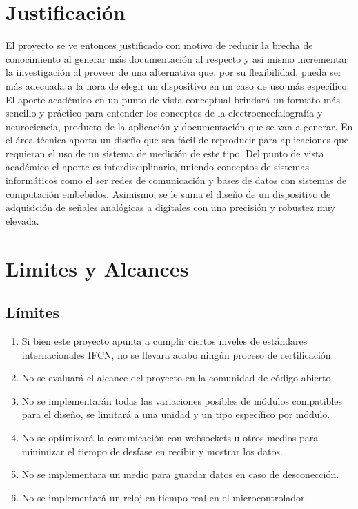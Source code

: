 \section{Justificación}
\label{sec:org0a2ade5}
El proyecto se ve entonces justificado con motivo de reducir la brecha de conocimiento al generar más documentación al respecto y así mismo incrementar la investigación al proveer de una alternativa que, por su flexibilidad, pueda ser más adecuada a la hora de elegir un dispositivo en un caso de uso más específico. El aporte académico en un punto de vista conceptual brindará un formato más sencillo y práctico para entender los conceptos de la electroencefalografía y neurociencia, producto de la aplicación y documentación que se van a generar. En el área técnica aporta un diseño que sea fácil de reproducir para aplicaciones que requieran el uso de un sistema de medición de este tipo.
Del punto de vista académico el aporte es interdisciplinario, uniendo conceptos de sistemas informáticos como el ser redes de comunicación y bases de datos con sistemas de computación embebidos. Asimismo, se le suma el diseño de un dispositivo de adquisición de señales analógicas a digitales con una precisión y robustez muy elevada.
\section{Limites y Alcances}
\label{sec:orgcde6f5e}
\subsection{Límites}
\label{sec:org50d0b59}
\begin{enumerate}
\item Si bien este proyecto apunta a cumplir ciertos niveles de estándares internacionales IFCN, no se llevara acabo ningún proceso de certificación.
\item No se evaluará el alcance del proyecto en la comunidad de código abierto.
\item No se implementarán todas las variaciones posibles de módulos compatibles para el diseño, se limitará a una unidad y un tipo específico por módulo.
\item No se optimizará la comunicación con websockets u otros medios para minimizar el tiempo de desfase en recibir y mostrar los datos.
\item No se implementara un medio para guardar datos en caso de desconección.
\item No se implementará un reloj en tiempo real en el microcontrolador.
\end{enumerate}
